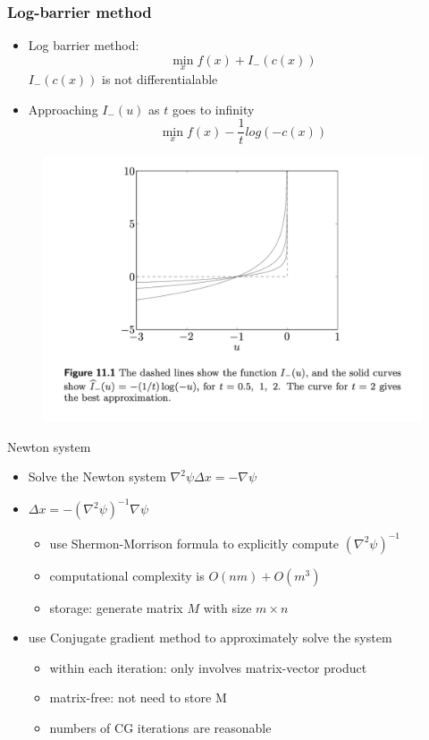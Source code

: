 \documentclass{beamer}
\begin{document}
\begin{frame}
\frametitle{Log-barrier method}
\begin{itemize}
    \item Log barrier method: 
    $$\min_x f(x)+I_{-}(c(x))$$
    $I_{-}(c(x))$ is not differentialable
    \item Approaching $I_{-}(u)$ as $t$ goes to infinity
    $$
    \min_x f(x)-\frac{1}{t}log(-c(x))
    $$
\end{itemize}
\begin{figure}
    \centering
    \includegraphics[width=0.6\linewidth]{Interior Point Method/logbarrier.png}
\end{figure}
\end{frame}

\begin{frame}{Newton system}
    \begin{itemize}
        \item Solve the Newton system $\nabla^2 \psi \Delta x = -\nabla \psi$
        \item $\Delta x = -\left(\nabla^2 \psi\right)^{-1}\nabla \psi$
        \begin{itemize}
            \item use Shermon-Morrison formula to explicitly compute $\left(\nabla^2 \psi\right)^{-1}$
            \item computational complexity is $O(nm)+O(m^3)$
            \item storage: generate matrix $M$ with size $m\times n$
        \end{itemize}
    \item use Conjugate gradient method to approximately solve the system
    \begin{itemize}
        \item within each iteration: only involves matrix-vector product
        \item matrix-free: not need to store M
        \item numbers of CG iterations are reasonable
    \end{itemize}
    \end{itemize}
\end{frame}
\end{document}
